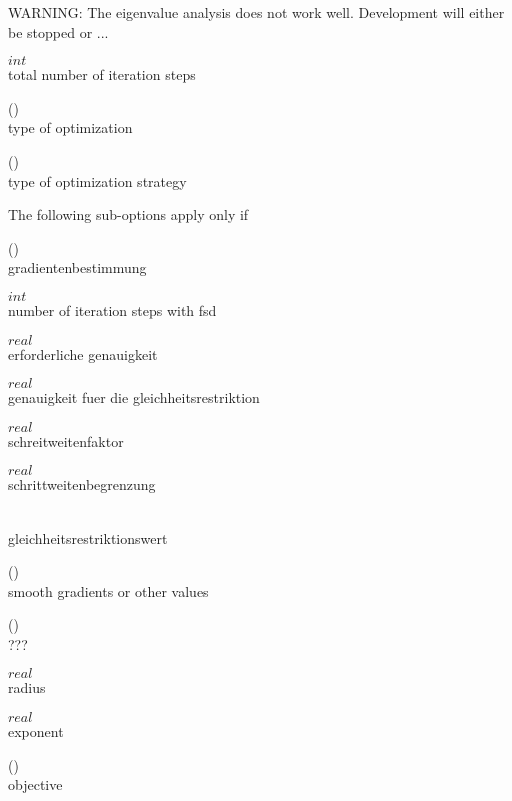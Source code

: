 WARNING: The eigenvalue analysis does not work well. Development will either
be stopped or ...

 $int$\\
total number of iteration steps

 (\kor{})\\
type of optimization

 (\kor{})\\
type of optimization strategy

The following sub-options apply only if 

 (\kor{})\\
gradientenbestimmung

 $int$\\
number of iteration steps with fsd

 $real$\\
erforderliche genauigkeit                  

 $real$\\
genauigkeit fuer die gleichheitsrestriktion

 $real$\\
schreitweitenfaktor                        

 $real$\\
schrittweitenbegrenzung                    

\\
gleichheitsrestriktionswert                

  (\kor{})\\
smooth gradients or other values

 (\kor{})\\
???

 $real$\\
radius

 $real$\\
exponent

 (\kor{})\\
objective



